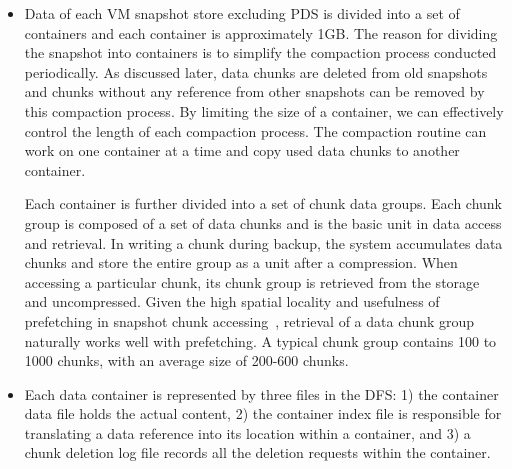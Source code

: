 \begin{itemize}


 
\item Data of each VM snapshot store excluding PDS is divided into a set of containers and 
each container is approximately 1GB. 
The reason for dividing the snapshot into containers is to simplify the compaction process
conducted periodically. As discussed later, data chunks are deleted from old snapshots
and chunks without any reference from other snapshots can be removed by this compaction process.
By limiting the size of a container, we can effectively control the length of each compaction process.
The compaction  routine can work on one container at a time and copy used data chunks to another container. 


Each container is further divided into a set of chunk data groups. Each chunk group is composed of
a set of data chunks and is the basic unit in data access and retrieval. 
In writing a chunk during backup, the system accumulates data chunks and store the entire
group as a unit after a compression.
When accessing a particular chunk, its chunk group is retrieved from the storage
and uncompressed. Given the high spatial locality and usefulness of prefetching  in 
snapshot chunk accessing~\cite{Sampling,FoundationPaper},
retrieval of  a data chunk  group naturally works well with prefetching. 
A  typical chunk group contains 100 to 1000 chunks, with an average size of 
200-600 chunks.
\item Each data container is represented by three files in the DFS:
1) the container data file holds the actual content, 
2) the container index file is responsible for translating a data reference
into its location within a container, and 
3) a chunk deletion log file records all the deletion requests within  the container.



\end{itemize}
